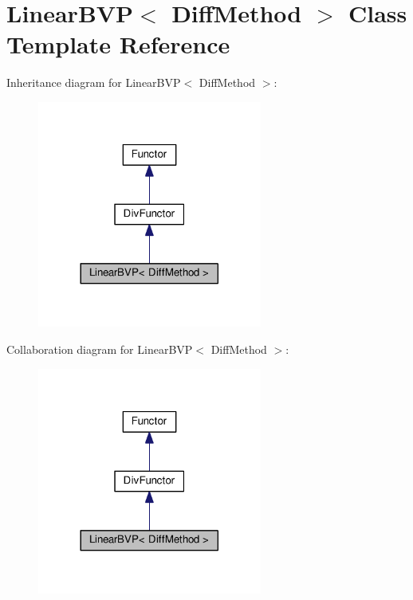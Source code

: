 \hypertarget{classLinearBVP}{}\section{Linear\+B\+VP$<$ Diff\+Method $>$ Class Template Reference}
\label{classLinearBVP}


Inheritance diagram for Linear\+B\+VP$<$ Diff\+Method $>$\+:
\nopagebreak
\begin{figure}[H]
\begin{center}
\leavevmode
\includegraphics[width=209pt]{classLinearBVP__inherit__graph}
\end{center}
\end{figure}


Collaboration diagram for Linear\+B\+VP$<$ Diff\+Method $>$\+:
\nopagebreak
\begin{figure}[H]
\begin{center}
\leavevmode
\includegraphics[width=209pt]{classLinearBVP__coll__graph}
\end{center}
\end{figure}
